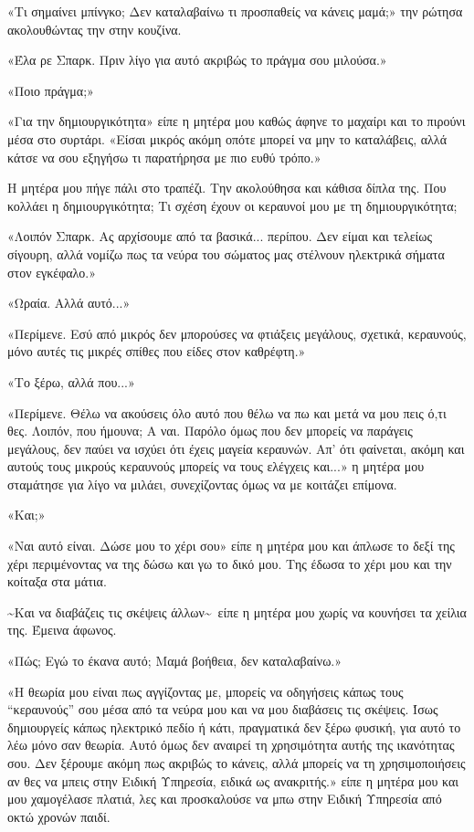 \documentclass[12pt,twoside, openany]{book}
\begin{document}
«Τι σημαίνει μπίνγκο; Δεν καταλαβαίνω τι προσπαθείς να κάνεις μαμά;» την ρώτησα ακολουθώντας την στην κουζίνα.

«Έλα ρε Σπαρκ. Πριν λίγο για αυτό ακριβώς το πράγμα σου μιλούσα.»

«Ποιο πράγμα;»

«Για την δημιουργικότητα» είπε η μητέρα μου καθώς άφηνε το μαχαίρι και το πιρούνι μέσα στο συρτάρι. «Είσαι μικρός ακόμη οπότε μπορεί να μην το καταλάβεις, αλλά κάτσε να σου εξηγήσω τι παρατήρησα με πιο ευθύ τρόπο.»

Η μητέρα μου πήγε πάλι στο τραπέζι. Την ακολούθησα και κάθισα δίπλα της. Που κολλάει η δημιουργικότητα; Τι σχέση έχουν οι κεραυνοί μου με τη δημιουργικότητα;

«Λοιπόν Σπαρκ. Ας αρχίσουμε από τα βασικά... περίπου. Δεν είμαι και τελείως σίγουρη, αλλά νομίζω πως τα νεύρα του σώματος μας στέλνουν ηλεκτρικά σήματα στον εγκέφαλο.»

«Ωραία. Αλλά αυτό...»

«Περίμενε. Εσύ από μικρός δεν μπορούσες να φτιάξεις μεγάλους, σχετικά, κεραυνούς, μόνο αυτές τις μικρές σπίθες που είδες στον καθρέφτη.»

«Το ξέρω, αλλά που...»

«Περίμενε. Θέλω να ακούσεις όλο αυτό που θέλω να πω και μετά να μου πεις ό,τι θες. Λοιπόν, που ήμουνα; Α ναι. Παρόλο όμως που δεν μπορείς να παράγεις μεγάλους, δεν παύει να ισχύει ότι έχεις μαγεία κεραυνών. Απ’ ότι φαίνεται, ακόμη και αυτούς τους μικρούς κεραυνούς μπορείς να τους ελέγχεις και...» η μητέρα μου σταμάτησε για λίγο να μιλάει, συνεχίζοντας όμως να με κοιτάζει επίμονα.

«Και;»

«Ναι αυτό είναι. Δώσε μου το χέρι σου» είπε η μητέρα μου και άπλωσε το δεξί της χέρι περιμένοντας να της δώσω και γω το δικό μου. Της έδωσα το χέρι μου και την κοίταξα στα μάτια.

\textasciitilde Και να διαβάζεις τις σκέψεις άλλων\textasciitilde\  είπε η μητέρα μου χωρίς να κουνήσει τα χείλια της. Έμεινα άφωνος.

«Πώς; Εγώ το έκανα αυτό; Μαμά βοήθεια, δεν καταλαβαίνω.»

«Η θεωρία μου είναι πως αγγίζοντας με, μπορείς να οδηγήσεις κάπως τους “κεραυνούς” σου μέσα από τα νεύρα μου και να μου διαβάσεις τις σκέψεις. Ίσως δημιουργείς κάπως ηλεκτρικό πεδίο ή κάτι, πραγματικά δεν ξέρω φυσική, για αυτό το λέω μόνο σαν θεωρία. Αυτό όμως δεν αναιρεί τη χρησιμότητα αυτής της ικανότητας σου. Δεν ξέρουμε ακόμη πως ακριβώς το κάνεις, αλλά μπορείς να τη χρησιμοποιήσεις αν θες να μπεις στην Ειδική Υπηρεσία, ειδικά ως ανακριτής.» είπε η μητέρα μου και μου χαμογέλασε πλατιά, λες και προσκαλούσε να μπω στην Ειδική Υπηρεσία από οκτώ χρονών παιδί.
\end{document}
